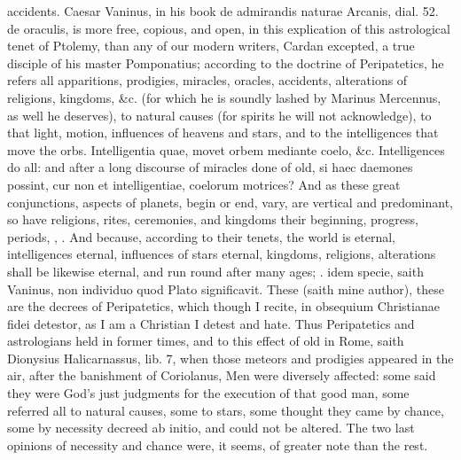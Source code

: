 {accidents. Caesar Vaninus, in his book de admirandis naturae Arcanis,
dial. 52. de oraculis, is more free, copious, and open, in this
explication of this astrological tenet of Ptolemy, than any of our
modern writers, Cardan excepted, a true disciple of his master
Pomponatius; according to the doctrine of Peripatetics, he refers all
apparitions, prodigies, miracles, oracles, accidents, alterations of
religions, kingdoms, \&c. (for which he is soundly lashed by Marinus
Mercennus, as well he deserves), to natural causes (for spirits he will
not acknowledge), to that light, motion, influences of heavens and
stars, and to the intelligences that move the orbs. Intelligentia quae,
movet orbem mediante coelo, \&c. Intelligences do all: and after a long
discourse of miracles done of old, si haec daemones possint, cur non et
intelligentiae, coelorum motrices? And as these great conjunctions,
aspects of planets, begin or end, vary, are vertical and predominant,
so have religions, rites, ceremonies, and kingdoms their beginning,
progress, periods, , \etc{}. And because, according to their tenets, the world
is eternal, intelligences eternal, influences of stars eternal,
kingdoms, religions, alterations shall be likewise eternal, and run
round after many ages;  \etc{}. idem specie, saith Vaninus, non individuo quod
Plato significavit. These (saith mine author), these are the
decrees of Peripatetics, which though I recite, in obsequium
Christianae fidei detestor, as I am a Christian I detest and hate. Thus
Peripatetics and astrologians held in former times, and to this effect
of old in Rome, saith Dionysius Halicarnassus, lib. 7, when those
meteors and prodigies appeared in the air, after the banishment of
Coriolanus,  Men were diversely affected: some said they were
God's just judgments for the execution of that good man, some referred
all to natural causes, some to stars, some thought they came by chance,
some by necessity decreed ab initio, and could not be altered. The two
last opinions of necessity and chance were, it seems, of greater note
than the rest.

}
